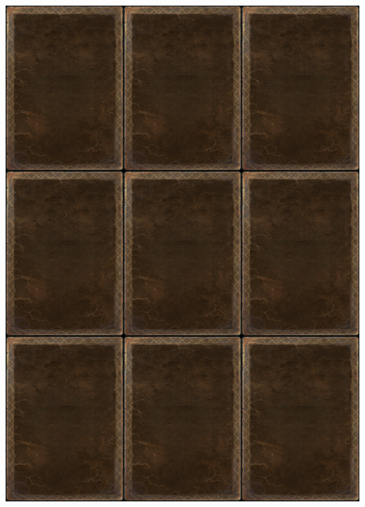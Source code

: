 \documentclass[a4paper]{article}
\begin{document}
\begin{center}
	\centering
	\includegraphics[width=190.5mm,height=266.7mm]{output/temp/page2.png}
\end{center}
\end{document}
